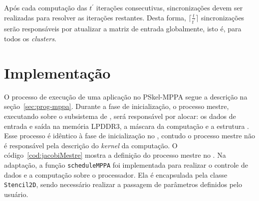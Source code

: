 

%

Após cada computação das $t^\prime$ iterações consecutivas,
sincronizações devem ser realizadas para resolver as iterações restantes. Desta
forma, $\lceil\frac{t}{t^\prime}\rceil$ sincronizações serão responsáveis por
atualizar a matriz de entrada globalmente, isto é, para todos os
\textit{clusters}.

\section{Implementação}

O processo de execução de uma aplicação no PSkel-MPPA segue a descrição na
seção~\ref{sec:prog-mppa}. Durante a fase de inicialização, o processo mestre, executando sobre o
subsistema de \es, será responsável por alocar: os dados de entrada e saída na
memória LPDDR3, a máscara da computação e a estrutura \stencil. Esse processo
é idêntico à fase de inicialização no \pskel, contudo o processo mestre não é
responsável pela descrição do \textit{kernel} da computação. O
código~\ref{cod:jacobiMestre} mostra a definição do processo mestre no \mppa.
Na adaptação, a função \texttt{scheduleMPPA} foi implementada para realizar o controle de dados e
a computação sobre o processador. Ela é encapsulada pela classe
\texttt{Stencil2D}, sendo necessário realizar a passagem de parâmetros definidos
pelo usuário.

